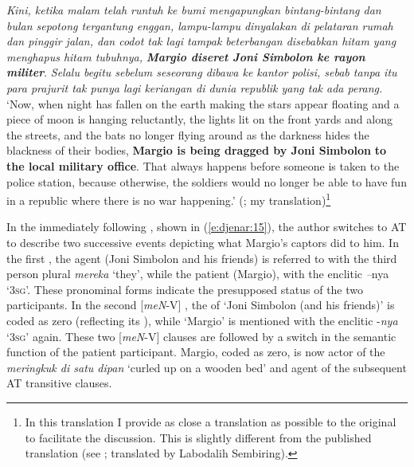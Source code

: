 \documentclass[output=paper
,modfonts
,nonflat]{langsci/langscibook}
\begin{document}
\begin{exe}
	\ex\label{e:djenar:14}
	\textit{Kini, ketika malam telah runtuh ke bumi mengapungkan bintang-bintang dan bulan sepotong tergantung enggan, lampu-lampu dinyalakan di pelataran rumah dan pinggir jalan, dan codot tak lagi tampak beterbangan disebabkan hitam yang menghapus hitam tubuhnya,} \textbf{\textit{Margio diseret Joni Simbolon ke rayon militer}}. \textit{Selalu begitu sebelum seseorang dibawa ke kantor polisi, sebab tanpa itu para prajurit tak punya lagi keriangan di dunia republik yang tak ada perang.} \\
	\glt ‘Now, when night has fallen on the earth making the stars appear floating and a piece of moon is hanging reluctantly, the lights lit on the front yards and along the streets, and the bats no longer flying around as the darkness hides the blackness of their bodies, \textbf{Margio is being dragged by Joni Simbolon} \textbf{to the local military office}. That always happens before someone is taken to the police station, because otherwise, the soldiers would no longer be able to have fun in a republic where there is no war happening.’ \hfill (\citealt[37]{Kurniawan2004}; my translation)\footnote{In this translation I provide as close a translation as possible to the original to facilitate the discussion. This is slightly different from the published  translation (see \citealt{Kurniawan2015}; translated by Labodalih Sembiring).}
\end{exe}

\noindent
In the immediately following , shown in (\ref{e:djenar:15}), the author switches to AT to describe two successive events depicting what Margio’s captors did to him. In the first , the agent (Joni Simbolon and his friends) is referred to with the third person plural  \textit{mereka} ‘they’, while the patient (Margio), with the enclitic \textit–{nya} ‘\textsc{3sg}’. These pronominal forms indicate the presupposed status of the two participants. In the second [\textit{meN}-V] , the  of ‘Joni Simbolon (and his friends)’ is coded as zero (reflecting its ), while ‘Margio’ is mentioned with the enclitic -\textit{nya} ‘\textsc{3sg}’ again. These two [\textit{meN}-V] clauses are followed by a switch in the semantic function of the patient participant. Margio, coded as zero, is now actor of the  \textit{meringkuk di satu dipan} ‘curled up on a wooden bed’ and agent of the subsequent AT transitive clauses. 
\end{document}
